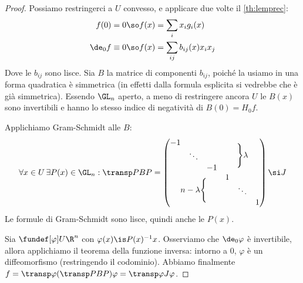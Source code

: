 \begin{proof}
	Possiamo restringerci a $U$ convesso, e applicare due volte il \autoref{th:lemprec}:
	\begin{align*}
		f(0)=0 &\so f(x)=\sum_ix_ig_i(x) \\
		\de_0f\equiv0 &\so f(x)=\sum_{ij}b_{ij}(x)x_ix_j
	\end{align*}
	Dove le $b_{ij}$ sono lisce. Sia $B$ la matrice di componenti $b_{ij}$, poiché la usiamo in una forma quadratica è \wlg simmetrica (in effetti dalla formula esplicita si vedrebbe che è già simmetrica).
	Essendo $\GL_n$ aperto, a meno di restringere ancora $U$ le $B(x)$ sono invertibili e hanno lo stesso indice di negatività di $B(0)=H_0f$.
	
	Applichiamo Gram-Schmidt alle $B$:
	\[\forall x\in U\,\exists P(x)\in\GL_n:
	\transp PBP=
	\begin{pmatrix}
		\begin{matrix}
			-1 & & \\
			& \ddots & \\
			& & -1 \\
		\end{matrix} & \Bigg\}\lambda \\
		n-\lambda\Bigg\{ & \begin{matrix}
			1 & & \\
			& \ddots & \\
			& & 1 \\
		\end{matrix}
	\end{pmatrix}\si J\]
	Le formule di Gram-Schmidt sono lisce, quindi anche le $P(x)$.
	
	Sia $\fundef[\varphi]U{\R^n}$ con $\varphi(x)\is P(x)^{-1}x$.
	Osserviamo che $\de_0\varphi$ è invertibile, allora applichiamo il teorema della funzione inversa: intorno a 0, $\varphi$ è un diffeomorfismo (restringendo il codominio).
	Abbiamo finalmente $f=\transp\varphi(\transp PBP)\varphi=\transp\varphi J\varphi$.
\end{proof}
